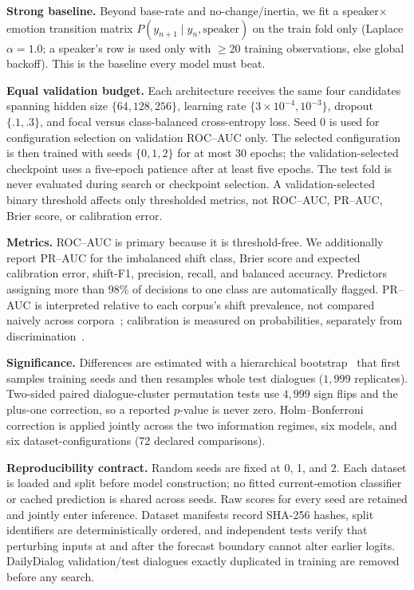 \documentclass{ieeeaccess}
\begin{document}
\textbf{Strong baseline.} Beyond base-rate and no-change/inertia, we fit a
speaker$\times$emotion transition matrix $P(y_{n+1} \mid y_n, \text{speaker})$ on the train fold
only (Laplace $\alpha{=}1.0$; a speaker's row is used only with $\geq$20 training observations,
else global backoff). This is the baseline every model must beat.

\textbf{Equal validation budget.} Each architecture receives the same four candidates spanning
hidden size $\{64,128,256\}$, learning rate $\{3\!\times\!10^{-4},10^{-3}\}$, dropout
$\{.1,.3\}$, and focal versus class-balanced cross-entropy loss. Seed 0 is used for configuration
selection on validation ROC--AUC only. The selected configuration is then trained with seeds
$\{0,1,2\}$ for at most 30 epochs; the validation-selected checkpoint uses a five-epoch patience
after at least five epochs. The test fold is never evaluated during search or checkpoint
selection. A validation-selected binary threshold affects only thresholded metrics, not ROC--AUC,
PR--AUC, Brier score, or calibration error.

\textbf{Metrics.} ROC--AUC is primary because it is threshold-free. We additionally report
PR--AUC for the imbalanced shift class, Brier score and expected calibration error, shift-F1,
precision, recall, and balanced accuracy. Predictors assigning more than 98\% of decisions to one
class are automatically flagged. PR--AUC is interpreted relative to each corpus's shift prevalence,
not compared naively across corpora~\cite{saito2015pr}; calibration is measured on probabilities,
separately from discrimination~\cite{guo2017calibration}.

\textbf{Significance.} Differences are estimated with a hierarchical bootstrap~\cite{saravanan2020bootstrap}
that first samples
training seeds and then resamples whole test dialogues ($1{,}999$ replicates). Two-sided paired
dialogue-cluster permutation tests use $4{,}999$ sign flips and the plus-one correction, so a
reported $p$-value is never zero. Holm--Bonferroni correction is applied jointly across the two
information regimes, six models, and six dataset-configurations (72 declared comparisons).

\textbf{Reproducibility contract.} Random seeds are fixed at 0, 1, and 2. Each dataset is loaded
and split before model construction; no fitted current-emotion classifier or cached prediction is
shared across seeds. Raw scores for every seed are retained and jointly enter inference. Dataset
manifests record SHA-256 hashes, split identifiers are deterministically ordered, and independent
tests verify that perturbing inputs at and after the forecast boundary cannot alter earlier logits.
DailyDialog validation/test dialogues exactly duplicated in training are removed before any search.
\end{document}
